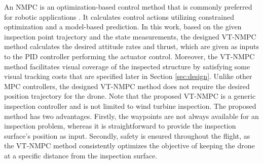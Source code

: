 
An NMPC is an optimization-based control method that is commonly preferred for robotic applications {\cite{mpc_survey, Mohit2017Receding, Mohitacc2018, Mehndiratta2019,quadplux,tilt,mohit_fault_tolerant_c,mohit_3dprint,tractor, kraus_mpc, arm_mpc}}. It calculates control actions utilizing constrained optimization and a model-based prediction. In this work, based on the given inspection point trajectory and the state measurements, the designed \ac{VT-NMPC} method calculates the desired attitude rates and thrust, which are given as inputs to the PID controller performing the actuator control. Moreover, the \ac{VT-NMPC} method facilitates visual coverage of the inspected structure by satisfying some visual tracking costs that are specified later in Section \ref{sec:design}.
Unlike other MPC controllers, the designed \ac{VT-NMPC} method does not require the desired position trajectory for the drone. Note that the proposed VT-NMPC is a generic inspection controller and is not limited to wind turbine inspection. The proposed method has two advantages. Firstly, the waypoints are not always available for an inspection problem, whereas it is straightforward to provide the inspection surface's position as input. Secondly, safety is ensured throughout the flight, as the \ac{VT-NMPC} method consistently optimizes the objective of keeping the drone at a specific distance from the inspection surface. 




